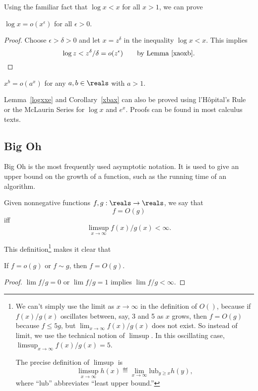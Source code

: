 Using the familiar fact that  $\log x < x$ for all $x >1$, we can prove
\begin{lemma}\label{logxxe}
$\log x = o(x^{\epsilon})$ for all $\epsilon >0$.
\end{lemma}

\begin{proof}
Choose $\epsilon > \delta > 0$ and let $x = z^\delta$ in the inequality
$\log x < x$.  This implies
\begin{equation}\label{zdd}
\log z  <  z^{\delta}/\delta
 =  o(z^{\epsilon})\qquad \text{by Lemma~\ref{xaoxb}}.
\end{equation}
\end{proof}

\begin{corollary}\label{xbax}
$x^b = o(a^x)$ for any $a,b \in \reals$ with $a>1$.
\end{corollary}

Lemma~\ref{logxxe} and Corollary~\ref{xbax} can also be proved using
l'H\^opital's Rule or the McLaurin Series for $\log x$ and $e^x$.
Proofs can be found in most calculus texts.

\subsection{Big Oh}

Big Oh is the most frequently used asymptotic notation.  It is used to
give an upper bound on the growth of a function, such as the running
time of an algorithm.
\begin{definition}
Given nonnegative functions $f, g : \reals \to \reals$, we
say that
\[
f = O(g)
\]
iff
\[
\limsup_{x \rightarrow \infty} f(x)/g(x) < \infty.
\]
\end{definition}
This definition\footnote{We can't simply use the limit as
$x \rightarrow \infty$ in the definition of $O()$, because if
$f(x)/g(x)$ oscillates between, say, 3 and 5 as $x$ grows, then $f =
O(g)$ because $f
\leq 5g$, but $\lim_{x \rightarrow \infty} f(x)/g(x)$ does not exist.
So instead of limit, we use the technical notion of $\limsup$.  In
this oscillating case, $\limsup_{x \rightarrow \infty} f(x)/g(x) = 5$.

The precise definition of $\limsup$ is
\[
\limsup_{x \rightarrow \infty} h(x) \eqdef \lim_{x \rightarrow \infty}
\text{lub}_{y \geq x} h(y),
\]
where ``lub'' abbreviates ``least upper bound.''} makes it clear that
\begin{lemma}\label{osimO}
If $f = o(g)$ or $f \sim g$, then $f = O(g)$.
\end{lemma}
\begin{proof}
$\lim f/g=0$ or $\lim f/g=1$ implies $\lim f/g<\infty$.
\end{proof}

